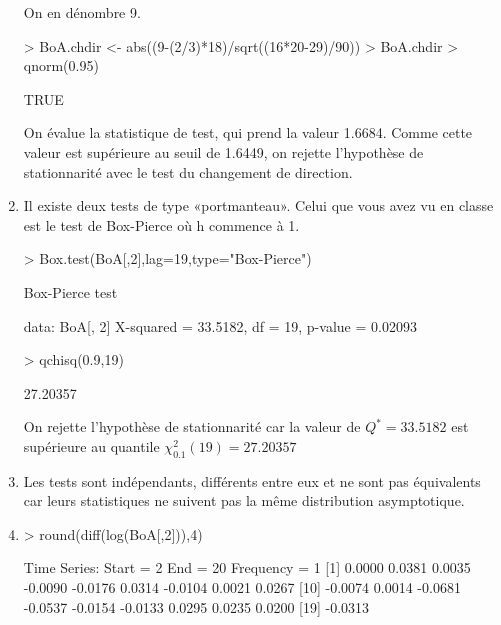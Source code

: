 \documentclass{article}
\begin{document}
\begin{enumerate}
On en dénombre 9.

\begin{Schunk}
\begin{Sinput}
> BoA.chdir <- abs((9-(2/3)*18)/sqrt((16*20-29)/90))
> BoA.chdir > qnorm(0.95)
\end{Sinput}
\begin{Soutput}
[1] TRUE
\end{Soutput}
\end{Schunk}
On évalue la statistique de test, qui prend la valeur 1.6684. Comme cette valeur est supérieure au seuil de 1.6449, on rejette l'hypothèse de stationnarité avec le test du changement de direction.
\item
  Il existe deux tests de type «portmanteau». Celui que vous avez vu en classe est le test de Box-Pierce où h commence à 1.
\begin{Schunk}
\begin{Sinput}
> Box.test(BoA[,2],lag=19,type="Box-Pierce")
\end{Sinput}
\begin{Soutput}
	Box-Pierce test

data:  BoA[, 2]
X-squared = 33.5182, df = 19, p-value = 0.02093
\end{Soutput}
\begin{Sinput}
> qchisq(0.9,19)
\end{Sinput}
\begin{Soutput}
[1] 27.20357
\end{Soutput}
\end{Schunk}

On rejette l'hypothèse de stationnarité car la valeur de $Q^{*}=33.5182$ est supérieure au quantile $\chi^2_{0.1}(19) = 27.20357$
  
\item
  Les tests sont indépendants, différents entre eux et ne sont pas équivalents 
  car leurs statistiques ne suivent pas la même distribution asymptotique.
  
\item
\begin{Schunk}
\begin{Sinput}
> round(diff(log(BoA[,2])),4)
\end{Sinput}
\begin{Soutput}
Time Series:
Start = 2 
End = 20 
Frequency = 1 
 [1]  0.0000  0.0381  0.0035 -0.0090 -0.0176  0.0314 -0.0104  0.0021  0.0267
[10] -0.0074  0.0014 -0.0681 -0.0537 -0.0154 -0.0133  0.0295  0.0235  0.0200
[19] -0.0313
\end{Soutput}
\end{Schunk}


\end{enumerate}
\end{document}
